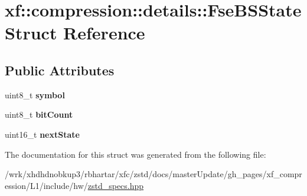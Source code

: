 \hypertarget{structxf_1_1compression_1_1details_1_1FseBSState}{\section{xf\-:\-:compression\-:\-:details\-:\-:Fse\-B\-S\-State Struct Reference}
\label{structxf_1_1compression_1_1details_1_1FseBSState}
}
\subsection*{Public Attributes}
\begin{DoxyCompactItemize}
\item 
\hypertarget{structxf_1_1compression_1_1details_1_1FseBSState_a9d488289f66782dd34b217c4bd0e69f3}{uint8\-\_\-t {\bfseries symbol}}\label{structxf_1_1compression_1_1details_1_1FseBSState_a9d488289f66782dd34b217c4bd0e69f3}

\item 
\hypertarget{structxf_1_1compression_1_1details_1_1FseBSState_a8684516bd49a1fbcf9472100e044648c}{uint8\-\_\-t {\bfseries bit\-Count}}\label{structxf_1_1compression_1_1details_1_1FseBSState_a8684516bd49a1fbcf9472100e044648c}

\item 
\hypertarget{structxf_1_1compression_1_1details_1_1FseBSState_aeb57ea51030f2185be44284aa5d0e045}{uint16\-\_\-t {\bfseries next\-State}}\label{structxf_1_1compression_1_1details_1_1FseBSState_aeb57ea51030f2185be44284aa5d0e045}

\end{DoxyCompactItemize}


The documentation for this struct was generated from the following file\-:\begin{DoxyCompactItemize}
\item 
/wrk/xhdhdnobkup3/rbhartar/xfc/zstd/docs/master\-Update/gh\-\_\-pages/xf\-\_\-compression/\-L1/include/hw/\hyperlink{zstd__specs_8hpp}{zstd\-\_\-specs.\-hpp}\end{DoxyCompactItemize}
